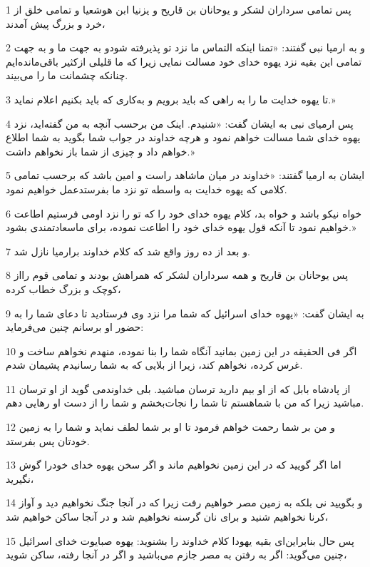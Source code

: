 \par 1 پس تمامی سرداران لشکر و یوحانان بن قاریح و یزنیا ابن هوشعیا و تمامی خلق از خرد و بزرگ پیش آمدند،
\par 2 و به ارمیا نبی گفتند: «تمنا اینکه التماس ما نزد تو پذیرفته شودو به جهت ما و به جهت تمامی این بقیه نزد یهوه خدای خود مسالت نمایی زیرا که ما قلیلی ازکثیر باقی‌مانده‌ایم چنانکه چشمانت ما را می‌بیند.
\par 3 تا یهوه خدایت ما را به راهی که باید برویم و به‌کاری که باید بکنیم اعلام نماید.»
\par 4 پس ارمیای نبی به ایشان گفت: «شنیدم. اینک من برحسب آنچه به من گفته‌اید، نزد یهوه خدای شما مسالت خواهم نمود و هر‌چه خداوند در جواب شما بگوید به شما اطلاع خواهم داد و چیزی از شما باز نخواهم داشت.»
\par 5 ایشان به ارمیا گفتند: «خداوند در میان ماشاهد راست و امین باشد که برحسب تمامی کلامی که یهوه خدایت به واسطه تو نزد ما بفرستدعمل خواهیم نمود.
\par 6 خواه نیکو باشد و خواه بد، کلام یهوه خدای خود را که تو را نزد اومی فرستیم اطاعت خواهیم نمود تا آنکه قول یهوه خدای خود را اطاعت نموده، برای ماسعادتمندی بشود.»
\par 7 و بعد از ده روز واقع شد که کلام خداوند برارمیا نازل شد.
\par 8 پس یوحانان بن قاریح و همه سرداران لشکر که همراهش بودند و تمامی قوم رااز کوچک و بزرگ خطاب کرده،
\par 9 به ایشان گفت: «یهوه خدای اسرائیل که شما مرا نزد وی فرستادید تا دعای شما را به حضور او برسانم چنین می‌فرماید:
\par 10 اگر فی الحقیقه در این زمین بمانید آنگاه شما را بنا نموده، منهدم نخواهم ساخت و غرس کرده، نخواهم کند، زیرا از بلایی که به شما رسانیدم پشیمان شدم.
\par 11 از پادشاه بابل که از او بیم دارید ترسان مباشید. بلی خداوندمی گوید از او ترسان مباشید زیرا که من با شماهستم تا شما را نجات‌بخشم و شما را از دست او رهایی دهم.
\par 12 و من بر شما رحمت خواهم فرمود تا او بر شما لطف نماید و شما را به زمین خودتان پس بفرستد.
\par 13 اما اگر گویید که در این زمین نخواهیم ماند و اگر سخن یهوه خدای خودرا گوش نگیرید،
\par 14 و بگویید نی بلکه به زمین مصر خواهیم رفت زیرا که در آنجا جنگ نخواهیم دید و آواز کرنا نخواهیم شنید و برای نان گرسنه نخواهیم شد و در آنجا ساکن خواهیم شد،
\par 15 پس حال بنابراین‌ای بقیه یهودا کلام خداوند را بشنوید: یهوه صبایوت خدای اسرائیل چنین می‌گوید: اگر به رفتن به مصر جازم می‌باشید و اگر در آنجا رفته، ساکن شوید، 
